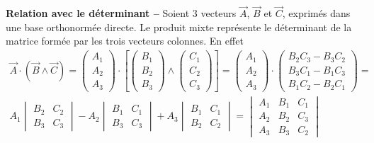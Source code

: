 \textbf{Relation avec le déterminant --} Soient 3 vecteurs $\overrightarrow{A}$, $\overrightarrow{B}$ et $\overrightarrow{C}$, exprimés dans une base orthonormée directe. Le produit mixte représente le déterminant de la matrice formée par les trois vecteurs colonnes. En effet 
\begin{multline*}
	\overrightarrow{A}\cdot(\overrightarrow{B}\wedge\overrightarrow{C})=
	\begin{pmatrix}A_1\\A_2\\A_3\end{pmatrix}\cdot
	\left[\begin{pmatrix}B_1\\B_2\\B_3\end{pmatrix}
	\wedge
	\begin{pmatrix}C_1\\C_2\\C_3\end{pmatrix}
	\right]	=
	\begin{pmatrix}A_1\\A_2\\A_3\end{pmatrix}\cdot	
	\begin{pmatrix}B_2C_3-B_3C_2\\B_3C_1-B_1C_3\\B_1C_2-B_2C_1\end{pmatrix}=\\
	A_1 \begin{vmatrix}B_2 & C_2\\B_3&C_3\end{vmatrix}-
	A_2\begin{vmatrix}B_1 & C_1\\B_3&C_3\end{vmatrix}+	
	A_3\begin{vmatrix}B_1 & C_1\\B_2&C_2\end{vmatrix}=
	\begin{vmatrix}A_1&B_1&C_1\\A_2&B_2&C_3\\A_3&B_3&C_2\end{vmatrix}			
\end{multline*}


